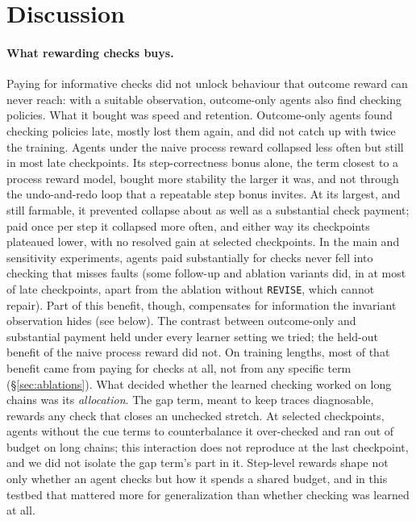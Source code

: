 \section{Discussion}
\label{sec:discussion}

\paragraph{What rewarding checks buys.}
Paying for informative checks did not unlock behaviour that outcome reward can never reach: with a suitable observation, outcome-only agents also find checking policies. What it bought was speed and retention. Outcome-only agents found checking policies late, mostly lost them again, and did not catch up with twice the training. Agents under the naive process reward collapsed less often but still in most late checkpoints. Its step-correctness bonus alone, the term closest to a process reward model, bought more stability the larger it was, and not through the undo-and-redo loop that a repeatable step bonus invites. At its largest, and still farmable, it prevented collapse about as well as a substantial check payment; paid once per step it collapsed more often, and either way its checkpoints plateaued lower, with no resolved gain at selected checkpoints. In the main and sensitivity experiments, agents paid substantially for checks never fell into checking that misses faults (some follow-up and ablation variants did, in at most  of late checkpoints, apart from the ablation without \texttt{REVISE}, which cannot repair). Part of this benefit, though, compensates for information the invariant observation hides (see below). The contrast between outcome-only and substantial payment held under every learner setting we tried; the held-out benefit of the naive process reward did not. On training lengths, most of that benefit came from paying for checks at all, not from any specific term (\S\ref{sec:ablations}). What decided whether the learned checking worked on long chains was its \emph{allocation}. The gap term, meant to keep traces diagnosable, rewards any check that closes an unchecked stretch. At selected checkpoints, agents without the cue terms to counterbalance it over-checked and ran out of budget on long chains; this interaction does not reproduce at the last checkpoint, and we did not isolate the gap term's part in it. Step-level rewards shape not only whether an agent checks but how it spends a shared budget, and in this testbed that mattered more for generalization than whether checking was learned at all.

